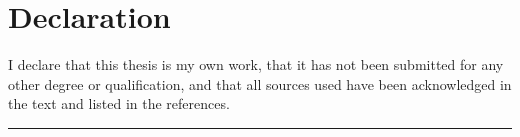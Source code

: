 \chapter{Declaration}

I declare that this thesis is my own work, that it has not been submitted for
any other degree or qualification, and that all sources used have been
acknowledged in the text and listed in the references.

\vspace{3\baselineskip}
\noindent\rule{6cm}{0.4pt}\\
\thesisauthor\\
\thesisdate
